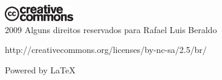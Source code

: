 \thispagestyle{empty}
\newpage
\begin{center}
\vspace{5.5cm}

\includegraphics[width=3cm]{cc.eps}\\
2009 Alguns direitos reservados para Rafael Luis Beraldo

\vspace{0.5em}
{\fontsize{9pt}{8pt}\selectfont http://creativecommons.org/licenses/by-nc-sa/2.5/br/}

\vfill

\selectfont\huge{Powered by \LaTeX{}}
\end{center}
